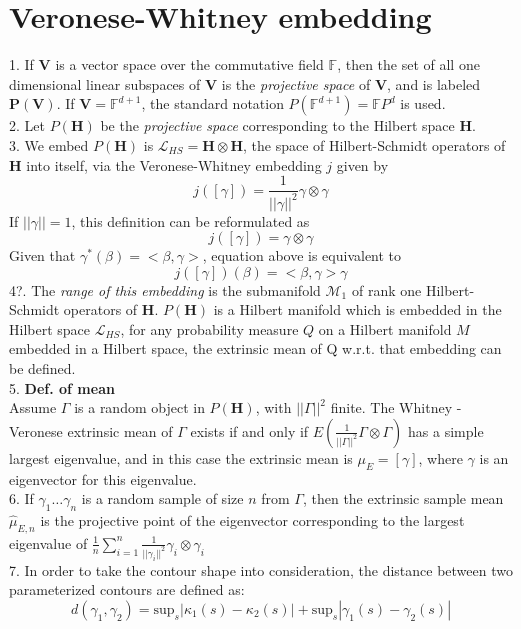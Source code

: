 \documentclass[12pt]{article}
\theoremstyle{definition}
\theoremstyle{remark}
\numberwithin{equation}{section}
\begin{document}
\section{Veronese-Whitney embedding}
1. If $\mathbf{V}$ is a vector space over the commutative field $\mathbb{F}$, then the set of all one dimensional linear subspaces of $\mathbf{V}$ is the \emph{projective space} of $\mathbf{V}$, and is labeled $\mathbf{P(V)}$. If $\mathbf{V} = \mathbb{F}^{d+1}$, the standard notation $P(\mathbb{F}^{d+1}) = \mathbb{F}P^d$ is used. \\[0.2cm]
2. Let $P(\mathbf{H})$ be the \emph{projective space} corresponding to the Hilbert space $\mathbf{H}$.\\[0.2cm]
3. We embed $P(\mathbf{H})$ is $\mathcal{L}_{HS} = \mathbf{H} \otimes \mathbf{H}$, the space of Hilbert-Schmidt operators of $\mathbf{H}$ into itself, via the Veronese-Whitney embedding $j$ given by 
\[j([\gamma]) = \frac{1}{||\gamma||^2} \gamma \otimes \gamma\]
If $||\gamma|| = 1$, this definition can be reformulated as 
\[j([\gamma]) = \gamma \otimes \gamma\]
Given that $\gamma^*(\beta) = <\beta , \gamma>$, equation above is equivalent to
\[j([\gamma])(\beta)= <\beta , \gamma> \gamma\]
4?. The \emph{range of this embedding} is the submanifold $\mathcal{M}_1$ of rank one Hilbert-Schmidt operators of $\mathbf{H}$.  $P(\mathbf{H})$ is a Hilbert manifold which is embedded in the Hilbert space $\mathcal{L}_{HS}$, for any probability measure $Q$ on a Hilbert manifold $M$ embedded in a Hilbert space, the extrinsic mean of Q w.r.t. that embedding can be defined. \\[0.2cm]
5. \textbf{Def. of mean} \\[0.2cm]
Assume $\Gamma$ is a random object in $P(\mathbf{H})$, with $||\Gamma||^2$ finite. The Whitney -Veronese extrinsic mean of $\Gamma$ exists if and only if $E(\frac{1}{||\Gamma||^2}\Gamma \otimes \Gamma)$ has a simple largest eigenvalue, and in this case the extrinsic mean is $\mu_E = [\gamma]$, where $\gamma$ is an eigenvector for this eigenvalue.\\[0.2cm]
6. If $\gamma_1 \dots \gamma_n$ is a random sample of size $n$ from $\Gamma$, then the extrinsic sample mean $\hat{\mu}_{E,n}$ is the projective point of the eigenvector corresponding to the largest eigenvalue of $\frac{1}{n}\sum_{i=1}^{n}\frac{1}{||\gamma_i||^2}\gamma_i \otimes \gamma_i$ \\[0.2cm]
7. In order to take the contour shape into consideration, the distance between two parameterized contours are defined as:
\[d(\gamma_1, \gamma_2) = \text{sup}_s|\kappa_1(s)-\kappa_2(s)|+\text{sup}_s|\gamma_1(s)-\gamma_2(s)|\] 
\end{document}
